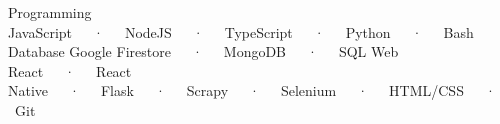 

\begin{cvtechnicals}
  \cvtechnical %
    {Programming} %
    {JavaScript~~~·~~~NodeJS~~~·~~~TypeScript~~~·~~~Python~~~·~~~Bash} %
    {Database} %
    {Google Firestore~~~·~~~MongoDB~~~·~~~SQL} %
    {Web} %
    {React~~~·~~~React Native~~~·~~~Flask~~~·~~~Scrapy~~~·~~~Selenium~~~·~~~HTML/CSS~~~·~~~Git} %
\end{cvtechnicals}